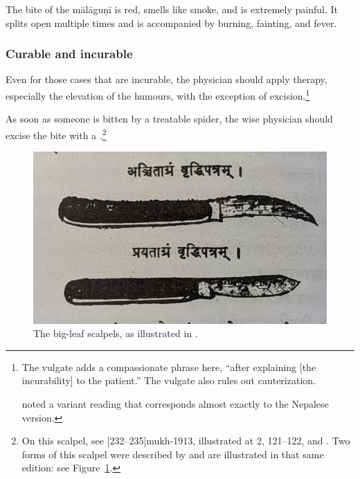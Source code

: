 \begin{translation}
\item [127]

The bite of the \Gls{mālāguṇī} is red, smells like smoke, and is extremely 
painful.  It splits open multiple times and is accompanied by burning, fainting, 
and fever. 

 \subsubsection{Curable and incurable}
 
\item [128]

Even for those cases that are incurable, the physician should apply
therapy, especially the elevation of the humours, with the exception
of excision.\footnote{The vulgate adds a compassionate phrase here,
    “after explaining [the incurability] to the patient.”  The vulgate
    also rules out cauterization.
    
     noted a variant reading  that corresponds almost exactly to the Nepalese version.}

\item [129]

As soon as someone is bitten by a treatable spider, the wise physician
should excise the bite with a .\footnote{On this scalpel, see
    [232--235]{mukh-1913}, illustrated at 2, 121--122, and
    \cite[83--84]{wuja-2003}. Two forms of this scalpel were described by
     and are illustrated in that same edition: see
    Figure~\ref{fig:vrddhipatrascalpel}.}
\begin{figure}
    \centering
    \includegraphics[width=0.7\linewidth]{media/vrddhipatra_scalpel}
    \caption{The big-leaf scalpels, as illustrated in \cite[36]{vulgate}.}
    \label{fig:vrddhipatrascalpel}
\end{figure}

\item[129 add 1]


\end{translation}
